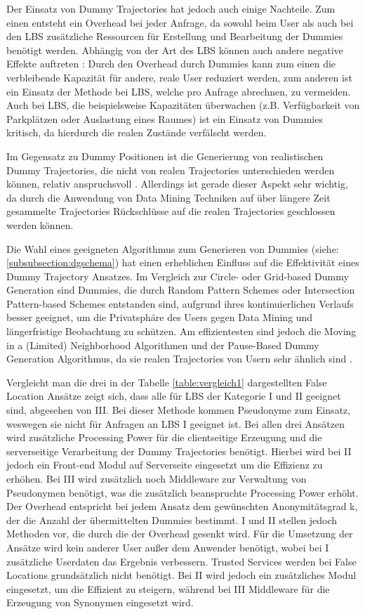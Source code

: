 Der Einsatz von Dummy Trajectories hat jedoch auch einige Nachteile. Zum einen entsteht ein Overhead bei jeder Anfrage, da sowohl beim User als auch bei den LBS zusätzliche Ressourcen für Erstellung und Bearbeitung der Dummies benötigt werden. Abhängig von der Art des LBS können auch andere negative Effekte auftreten \cite{Beresford2005}: Durch den Overhead durch Dummies kann zum einen die verbleibende Kapazität für andere, reale User reduziert werden, zum anderen ist ein Einsatz der Methode bei LBS, welche pro Anfrage abrechnen, zu vermeiden. Auch bei LBS, die beispielsweise Kapazitäten überwachen (z.B. Verfügbarkeit von Parkplätzen oder Auslastung eines Raumes) ist ein Einsatz von Dummies kritisch, da hierdurch die realen Zustände verfälscht werden.

Im Gegensatz zu Dummy Positionen ist die Generierung von realistischen Dummy Trajectories, die nicht von realen Trajectories unterschieden werden können, relativ anspruchsvoll \cite{Beresford2003}. Allerdings ist gerade dieser Aspekt sehr wichtig, da durch die Anwendung von Data Mining Techniken auf über längere Zeit gesammelte Trajectories Rückschlüsse auf die realen Trajectories geschlossen werden können. 

Die Wahl eines geeigneten Algorithmus zum Generieren von Dummies (siehe: \ref{subsubsection:dgschema}) hat einen erheblichen Einfluss auf die Effektivität eines Dummy Trajectory Ansatzes. Im Vergleich zur Circle- oder Grid-based Dummy Generation sind Dummies, die durch Random Pattern Schemes oder Intersection Pattern-based Schemes entstanden sind, aufgrund ihres kontinuierlichen Verlaufs besser geeignet, um die Privatsphäre des Users gegen Data Mining und längerfristige Beobachtung zu schützen. Am effizientesten sind jedoch die Moving in a (Limited) Neighborhood Algorithmen und der Pause-Based Dummy Generation Algorithmus, da sie realen Trajectories von Usern sehr ähnlich sind \cite{Kukkapalli2012}. 

Vergleicht man die drei in der Tabelle \ref{table:vergleich1} dargestellten False Location Ansätze zeigt sich, dass alle für LBS der Kategorie I und II geeignet sind, abgesehen von III. Bei dieser Methode kommen Pseudonyme zum Einsatz, weswegen sie nicht für Anfragen an LBS I geeignet ist. Bei allen drei Ansätzen wird zusätzliche Processing Power für die clientseitige Erzeugung und die serverseitige Verarbeitung der Dummy Trajectories benötigt. Hierbei wird bei II jedoch ein Front-end Modul auf Serverseite eingesetzt um die Effizienz zu erhöhen. Bei III wird zusätzlich noch Middleware zur Verwaltung von Pseudonymen benötigt, was die zusätzlich beanspruchte Processing Power erhöht. Der Overhead entspricht bei jedem Ansatz dem gewünschten Anonymitätsgrad k, der die Anzahl der übermittelten Dummies bestimmt. I und II stellen jedoch Methoden vor, die durch die der Overhead gesenkt wird. Für die Umsetzung der Ansätze wird kein anderer User außer dem Anwender benötigt, wobei bei I zusätzliche Userdaten das Ergebnis verbessern. Trusted Services werden bei False Locations grundsätzlich nicht benötigt. Bei II wird jedoch ein zusätzliches Modul eingesetzt, um die Effizient zu steigern, während bei III Middleware für die Erzeugung von Synonymen eingesetzt wird.